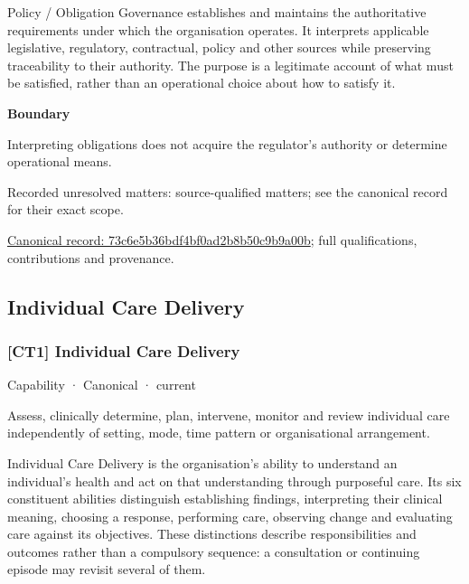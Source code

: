 Policy / Obligation Governance establishes and maintains the authoritative requirements under which the organisation operates. It interprets applicable legislative, regulatory, contractual, policy and other sources while preserving traceability to their authority. The purpose is a legitimate account of what must be satisfied, rather than an operational choice about how to satisfy it.



\textbf{Boundary}



Interpreting obligations does not acquire the regulator's authority or determine operational means.


{\small Recorded unresolved matters: source-qualified matters; see the canonical record for their exact scope.}\par
{\footnotesize \href{../../../../continuum/strategy/capability/73c6e5b36bdf4bf0ad2b8b50c9b9a00b.md}{Canonical record: 73c6e5b36bdf4bf0ad2b8b50c9b9a00b}; full qualifications, contributions and provenance.}\par
\subsection{Individual Care Delivery}

\subsubsection{[CT1] Individual Care Delivery}

\label{element:b964a11cde594318aa14ff935414158a}
{\small Capability · Canonical · current}\par

Assess, clinically determine, plan, intervene, monitor and review individual care independently of setting, mode, time pattern or organisational arrangement.



Individual Care Delivery is the organisation's ability to understand an individual's health and act on that understanding through purposeful care. Its six constituent abilities distinguish establishing findings, interpreting their clinical meaning, choosing a response, performing care, observing change and evaluating care against its objectives. These distinctions describe responsibilities and outcomes rather than a compulsory sequence: a consultation or continuing episode may revisit several of them.



